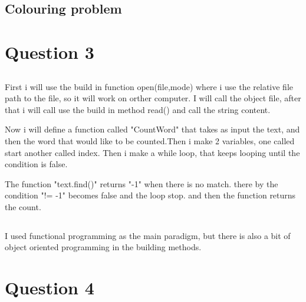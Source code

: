 \documentclass{article}
\begin{document}
\subsection{Colouring problem}


\section{ Question 3}

\subsection{}



First i will use the build in function open(file,mode) where i use the relative file path to the file, so it will work on orther computer. I will call the object file, after that i will call use the build in method read() and call the string content.

Now i will define a function called "CountWord" that takes as input the text, and then the word that would like to be counted.Then i make 2 variables, one called start another called index. Then i make a while loop, that keeps looping until the condition is false.

The function "text.find()" returns "-1" when there is no match. there by the condition "!= -1" becomes false and the loop stop.  and then the function returns the count.




\subsection{}


I used functional programming as the main paradigm, but there is also a bit of object oriented programming in the building methods. 


\subsection{}





\section{Question 4}
\subsection{}
\end{document}
